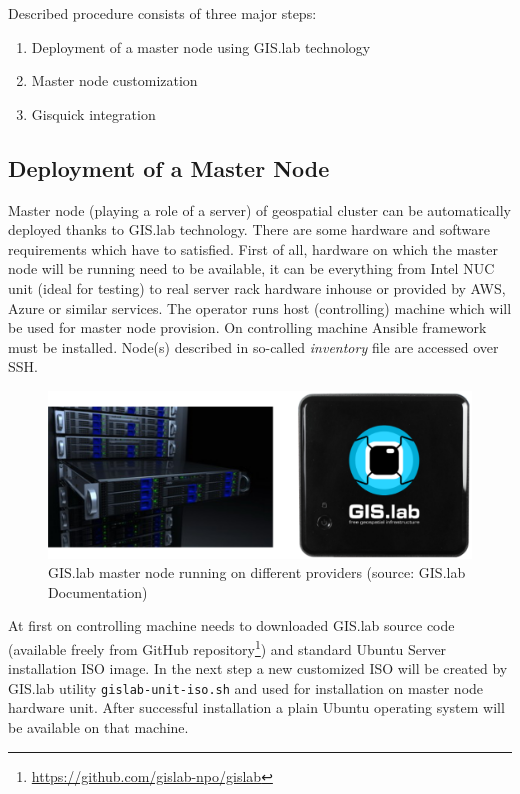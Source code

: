 \documentclass{isprs}
\begin{document}
Described procedure consists of three major steps:

\begin{enumerate}
\setlength\itemsep{0em}\setlength\parskip{0em}\setlength\topsep{0em}\setlength\partopsep{0em}\setlength\parsep{0em}
\item{Deployment of a master node using GIS.lab technology} 
\item{Master node customization}
\item{Gisquick integration}
\end{enumerate}

\subsection{Deployment of  a Master Node}\label{Deployment of Master Node}

Master node (playing a role of a server) of geospatial cluster can be
automatically deployed thanks to GIS.lab technology. There are some
hardware and software requirements which have to satisfied. First of
all, hardware on which the master node will be running need to be
available, it can be everything from Intel NUC unit (ideal for
testing) to real server rack hardware inhouse or provided by AWS,
Azure or similar services. The operator runs host (controlling)
machine which will be used for master node provision. On controlling
machine Ansible framework must be installed. Node(s) described in
so-called \textit{inventory} file are accessed over SSH.

\begin{figure}[ht!]
\begin{center}
  \includegraphics[width=0.9\columnwidth]{figures/gislab-unit.png}
  \caption{GIS.lab master node running on different providers (source:
    GIS.lab Documentation)}
\label{fig:gislab_infrastructure}
\end{center}
\end{figure}

At first on controlling machine needs to downloaded GIS.lab source
code (available freely from GitHub
repository\footnote{\url{https://github.com/gislab-npo/gislab}}) and
standard Ubuntu Server installation ISO image. In the next step a new
customized ISO will be created by GIS.lab utility
\texttt{gislab-unit-iso.sh} and used for installation on master node
hardware unit. After successful installation a plain Ubuntu operating
system will be available on that machine.
\end{document}

